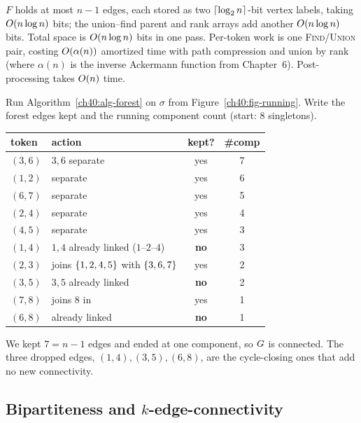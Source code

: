 \begin{complexitybox}
$F$ holds at most $n-1$ edges, each stored as two $\lceil\log_2 n\rceil$-bit vertex
labels, taking $O(n\log n)$ bits; the union--find parent and rank arrays add
another $O(n\log n)$ bits. Total space is $O(n\log n)$ bits in one pass.
Per-token work is one \textsc{Find}/\textsc{Union} pair, costing
$O(\alpha(n))$ amortized time with path compression and union by rank
(where $\alpha(n)$ is the inverse Ackermann function from Chapter~6).
Post-processing takes $O(n)$ time.
\end{complexitybox}

\begin{labbox}
Run Algorithm~\ref{ch40:alg-forest} on $\sigma$ from
Figure~\ref{ch40:fig-running}. Write the forest edges kept and the running
component count (start: $8$ singletons).

\begin{center}
\begin{tabular}{llcc}
\toprule
token & action & kept? & \#comp \\
\midrule
$(3,6)$ & $3,6$ separate & yes & 7 \\
$(1,2)$ & separate & yes & 6 \\
$(6,7)$ & separate & yes & 5 \\
$(2,4)$ & separate & yes & 4 \\
$(4,5)$ & separate & yes & 3 \\
$(1,4)$ & $1,4$ already linked ($1$--$2$--$4$) & \textbf{no} & 3 \\
$(2,3)$ & joins $\{1,2,4,5\}$ with $\{3,6,7\}$ & yes & 2 \\
$(3,5)$ & $3,5$ already linked & \textbf{no} & 2 \\
$(7,8)$ & joins $8$ in & yes & 1 \\
$(6,8)$ & already linked & \textbf{no} & 1 \\
\bottomrule
\end{tabular}
\end{center}

We kept $7=n-1$ edges and ended at one component, so $G$ is connected.
The three dropped edges, $(1,4),(3,5),(6,8)$, are the cycle-closing ones that
add no new connectivity.
\end{labbox}

\subsection{Bipartiteness and \texorpdfstring{$k$}{k}-edge-connectivity}

